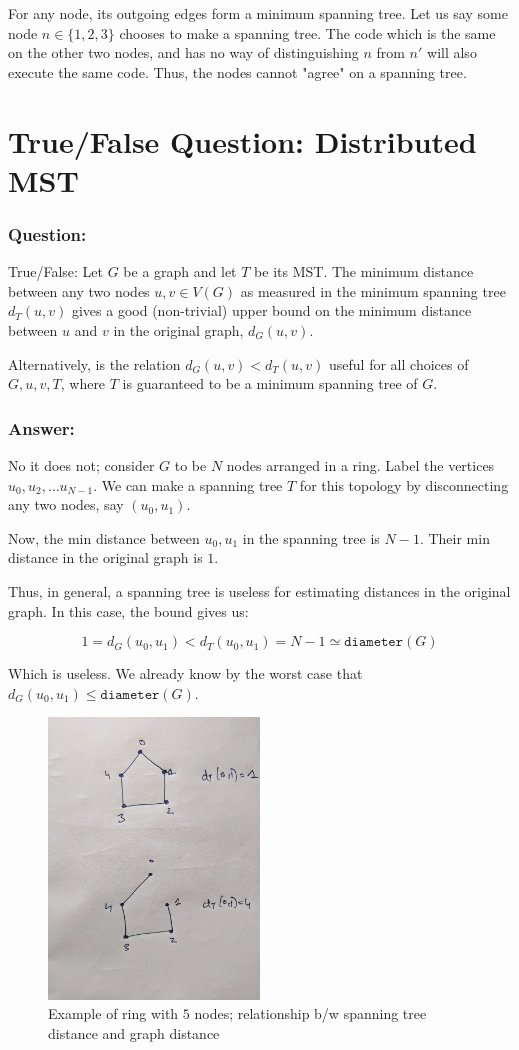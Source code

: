 \documentclass{article}
\begin{document}
For any node, its outgoing edges form a minimum spanning tree. Let us say
some node $n \in \{1, 2, 3\}$ chooses to make a spanning tree. The code which is the
same on the other two nodes, and has no way of distinguishing $n$ from $n'$
will also execute the same code. Thus, the nodes cannot "agree" on a spanning
tree.

\section{True/False Question: Distributed MST}
\subsubsection{Question:}
True/False: Let $G$ be a graph and let $T$ be its MST. The minimum distance between any two nodes $u, v \in V(G)$
as measured in the minimum spanning tree $d_T(u, v)$ gives a good (non-trivial) upper
bound on the minimum distance between $u$ and $v$ in the original graph, $d_G(u, v)$.

Alternatively, is the relation $d_G(u, v) < d_T(u, v)$ useful for all choices
of $G, u, v, T$, where $T$ is guaranteed to be a minimum spanning tree of $G$.

\subsubsection{Answer:} No it does not; consider $G$ to be $N$ nodes arranged
in a ring. Label the vertices $u_0, u_2, \dots u_{N-1}$. We can
make a spanning tree $T$ for this topology by disconnecting any two nodes, say $(u_0, u_1)$.

Now, the min distance between $u_0, u_1$ in the spanning tree is $N-1$. Their
min distance in the original graph is $1$. 

Thus, in general, a spanning tree is useless for estimating distances in
the original graph. In this case, the bound gives us:

$$
1 = d_G(u_0, u_1) < d_T(u_0, u_1) = N - 1 \simeq \texttt{diameter}(G)
$$

Which is useless. We already know by the worst case that $d_G(u_0, u_1) \leq \texttt{diameter}(G)$.

\begin{figure}[h]
\centering
\includegraphics[width=0.5\textwidth]{graph-spanning-tree.jpg}
\caption{Example of ring with $5$ nodes; relationship b/w spanning tree distance and graph distance}
\end{figure}
\end{document}
